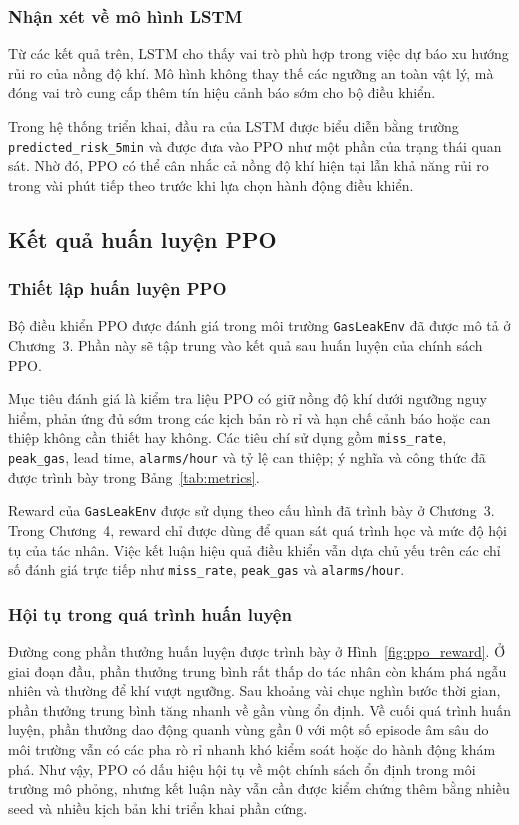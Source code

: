 \subsubsection{Nhận xét về mô hình LSTM}

Từ các kết quả trên, LSTM cho thấy vai trò phù hợp trong việc dự báo xu hướng rủi ro của nồng độ khí. Mô hình không thay thế các ngưỡng an toàn vật lý, mà đóng vai trò cung cấp thêm tín hiệu cảnh báo sớm cho bộ điều khiển.

Trong hệ thống triển khai, đầu ra của LSTM được biểu diễn bằng trường \texttt{predicted\_risk\_5min} và được đưa vào PPO như một phần của trạng thái quan sát. Nhờ đó, PPO có thể cân nhắc cả nồng độ khí hiện tại lẫn khả năng rủi ro trong vài phút tiếp theo trước khi lựa chọn hành động điều khiển.

\subsection{Kết quả huấn luyện PPO}
\label{sec:ppo_training_results}

\subsubsection{Thiết lập huấn luyện PPO}

Bộ điều khiển PPO được đánh giá trong môi trường \texttt{GasLeakEnv} đã được mô tả ở Chương~3. Phần này sẽ tập trung vào kết quả sau huấn luyện của chính sách PPO.

Mục tiêu đánh giá là kiểm tra liệu PPO có giữ nồng độ khí dưới ngưỡng nguy hiểm, phản ứng đủ sớm trong các kịch bản rò rỉ và hạn chế cảnh báo hoặc can thiệp không cần thiết hay không. Các tiêu chí sử dụng gồm \texttt{miss\_rate}, \texttt{peak\_gas}, lead time, \texttt{alarms/hour} và tỷ lệ can thiệp; ý nghĩa và công thức đã được trình bày trong Bảng~\ref{tab:metrics}.

Reward của \texttt{GasLeakEnv} được sử dụng theo cấu hình đã trình bày ở Chương~3. Trong Chương~4, reward chỉ được dùng để quan sát quá trình học và mức độ hội tụ của tác nhân. Việc kết luận hiệu quả điều khiển vẫn dựa chủ yếu trên các chỉ số đánh giá trực tiếp như \texttt{miss\_rate}, \texttt{peak\_gas} và \texttt{alarms/hour}.

\subsubsection{Hội tụ trong quá trình huấn luyện}

Đường cong phần thưởng huấn luyện được trình bày ở Hình~\ref{fig:ppo_reward}. Ở giai đoạn đầu, phần thưởng trung bình rất thấp do tác nhân còn khám phá ngẫu nhiên và thường để khí vượt ngưỡng. Sau khoảng vài chục nghìn bước thời gian, phần thưởng trung bình tăng nhanh về gần vùng ổn định. Về cuối quá trình huấn luyện, phần thưởng dao động quanh vùng gần 0 với một số episode âm sâu do môi trường vẫn có các pha rò rỉ nhanh khó kiểm soát hoặc do hành động khám phá. Như vậy, PPO có dấu hiệu hội tụ về một chính sách ổn định trong môi trường mô phỏng, nhưng kết luận này vẫn cần được kiểm chứng thêm bằng nhiều seed và nhiều kịch bản khi triển khai phần cứng.

